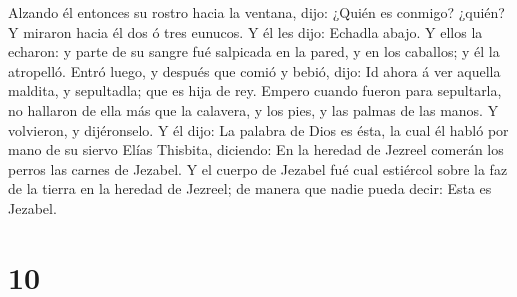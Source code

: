 Alzando él entonces su rostro hacia la ventana, dijo: ¿Quién es conmigo?
¿quién? Y miraron hacia él dos ó tres eunucos.  Y él les
dijo: Echadla abajo. Y ellos la echaron: y parte de su sangre fué
salpicada en la pared, y en los caballos; y él la atropelló.
 Entró luego, y después que comió y bebió, dijo: Id ahora á
ver aquella maldita, y sepultadla; que es hija de rey. 
Empero cuando fueron para sepultarla, no hallaron de ella más que la
calavera, y los pies, y las palmas de las manos.  Y
volvieron, y dijéronselo. Y él dijo: La palabra de Dios es ésta, la cual
él habló por mano de su siervo Elías Thisbita, diciendo: En la heredad
de Jezreel comerán los perros las carnes de Jezabel.  Y el
cuerpo de Jezabel fué cual estiércol sobre la faz de la tierra en la
heredad de Jezreel; de manera que nadie pueda decir: Esta es Jezabel.

\hypertarget{section-9}{%
\section{10}\label{section-9}}


